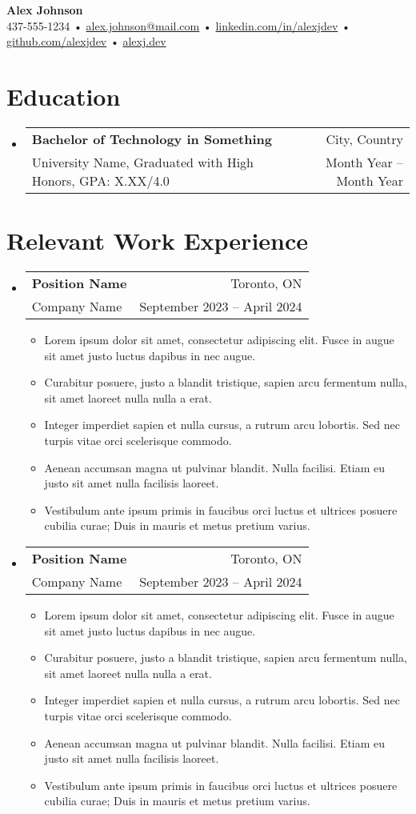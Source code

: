 \documentclass[letterpaper,11pt]{article}
\makeatletter
\let\hrefWithoutArrow\href
\renewcommand{\href}[2]{\hrefWithoutArrow{#1}{\ifthenelse{\equal{#2}{}}{ }{#2\ }\raisebox{.15ex}{\footnotesize \faExternalLink*}}}
\newcommand{\resumeItemNH}[1]{
  \item\small{
    {#1 \vspace{-2pt}}
  }
}
\newcommand{\resumeSubheading}[4]{
  \vspace{-1pt}\item
    \begin{tabular*}{\textwidth}{l@{\extracolsep{\fill}}r}
      \textbf{#1} & #2 \\
      \small#3 & \small #4 \\
    \end{tabular*}\vspace{-6pt}
}
\newcommand{\resumeSubHeadingListStart}{\begin{itemize}[leftmargin=0pt,label={}]}
\newcommand{\resumeSubHeadingListEnd}{\end{itemize}}
\newcommand{\resumeItemListStart}{\begin{itemize}}
\newcommand{\resumeItemListEnd}{\end{itemize}}
\makeatother
\begin{document}
{\LARGE \textbf{Alex Johnson}}\\[0.5em]
\small
437-555-1234 •
\hrefWithoutArrow{mailto:alex.johnson@mail.com}{alex.johnson@mail.com} •
\hrefWithoutArrow{https://linkedin.com/in/alexjdev/}{linkedin.com/in/alexjdev} •
\hrefWithoutArrow{https://github.com/alexjdev}{github.com/alexjdev} •
\hrefWithoutArrow{https://www.alexj.dev}{alexj.dev}\\[0.6em]

\section{Education}
  \resumeSubHeadingListStart
    \resumeSubheading
      {Bachelor of Technology in Something}{City, Country}
      {University Name, Graduated with High Honors, GPA: X.XX/4.0}{Month Year -- Month Year}
  \resumeSubHeadingListEnd

\section{Relevant Work Experience}
  \resumeSubHeadingListStart
    \resumeSubheading
      {Position Name}{Toronto, ON}
      {Company Name}{September 2023 -- April 2024}
      \resumeItemListStart
        \resumeItemNH{Lorem ipsum dolor sit amet, consectetur adipiscing elit. Fusce in augue sit amet justo luctus dapibus in nec augue.}
        \resumeItemNH{Curabitur posuere, justo a blandit tristique, sapien arcu fermentum nulla, sit amet laoreet nulla nulla a erat.}
        \resumeItemNH{Integer imperdiet sapien et nulla cursus, a rutrum arcu lobortis. Sed nec turpis vitae orci scelerisque commodo.}
        \resumeItemNH{Aenean accumsan magna ut pulvinar blandit. Nulla facilisi. Etiam eu justo sit amet nulla facilisis laoreet.}
        \resumeItemNH{Vestibulum ante ipsum primis in faucibus orci luctus et ultrices posuere cubilia curae; Duis in mauris et metus pretium varius.}
      \resumeItemListEnd

    \resumeSubheading
      {Position Name}{Toronto, ON}
      {Company Name}{September 2023 -- April 2024}
      \resumeItemListStart
        \resumeItemNH{Lorem ipsum dolor sit amet, consectetur adipiscing elit. Fusce in augue sit amet justo luctus dapibus in nec augue.}
        \resumeItemNH{Curabitur posuere, justo a blandit tristique, sapien arcu fermentum nulla, sit amet laoreet nulla nulla a erat.}
        \resumeItemNH{Integer imperdiet sapien et nulla cursus, a rutrum arcu lobortis. Sed nec turpis vitae orci scelerisque commodo.}
        \resumeItemNH{Aenean accumsan magna ut pulvinar blandit. Nulla facilisi. Etiam eu justo sit amet nulla facilisis laoreet.}
        \resumeItemNH{Vestibulum ante ipsum primis in faucibus orci luctus et ultrices posuere cubilia curae; Duis in mauris et metus pretium varius.}
      \resumeItemListEnd
  \resumeSubHeadingListEnd
\end{document}
